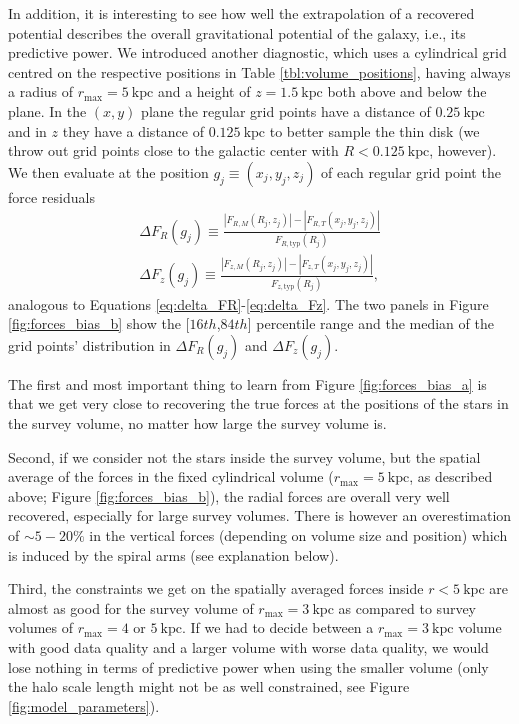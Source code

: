 \documentclass[iop,revtex4,numberedappendix,appendixfloats]{emulateapj}
\begin{document}
In addition, it is interesting to see how well the extrapolation of a recovered potential describes the overall gravitational potential of the galaxy, i.e., its predictive power. We introduced another diagnostic, which uses a cylindrical grid centred on the respective positions in Table \ref{tbl:volume_positions}, having always a radius of $r_\text{max}=5~\text{kpc}$ and a height of $z=1.5~\text{kpc}$ both above and below the plane.  In the $(x,y)$ plane the regular grid points have a distance of $0.25~\text{kpc}$ and in $z$ they have a distance of  $0.125~\text{kpc}$ to better sample the thin disk (we throw out grid points close to the galactic center with $R<0.125~\text{kpc}$, however). We then evaluate at the position $g_j \equiv (x_j,y_j,z_j)$ of each regular grid point the force residuals
\begin{eqnarray}
\Delta F_R(g_j) \equiv \frac{|F_{R,M}(R_j,z_j)| - |F_{R,T}(x_j,y_j,z_j)|}{F_{R,\text{typ}}(R_j)} \label{eq:delta_FR_grid}\\
\Delta F_z(g_j) \equiv \frac{|F_{z,M}(R_j,z_j)| - |F_{z,T}(x_j,y_j,z_j)|}{F_{z,\text{typ}}(R_j)},\label{eq:delta_Fz_grid}
\end{eqnarray}
analogous to Equations \eqref{eq:delta_FR}-\eqref{eq:delta_Fz}. The two panels in Figure \ref{fig:forces_bias_b} show the [$16th$,$84th$] percentile range and the median of the grid points' distribution in $\Delta F_R(g_j)$ and $\Delta F_z(g_j)$.

The first and most important thing to learn from Figure \ref{fig:forces_bias_a} is that we get very close to recovering the true forces at the positions of the stars in the survey volume, no matter how large the survey volume is.

Second, if we consider not the stars inside the survey volume, but the spatial average of the forces in the fixed cylindrical volume ($r_\text{max}=5~\text{kpc}$, as described above; Figure \ref{fig:forces_bias_b}), the radial forces are overall very well recovered, especially for large survey volumes. There is however an overestimation of $\sim5-20\%$ in the vertical forces (depending on volume size and position) which is induced by the spiral arms (see explanation below).

Third, the constraints we get on the spatially averaged forces inside $r<5~\text{kpc}$ are almost as good for the survey volume of $r_\text{max}=3~\text{kpc}$ as compared to survey volumes of $r_\text{max}=4$ or $5~\text{kpc}$. If we had to decide between a $r_\text{max}=3~\text{kpc}$ volume with good data quality and a larger volume with worse data quality, we would lose nothing in terms of predictive power when using the smaller volume (only the halo scale length might not be as well constrained, see Figure \ref{fig:model_parameters}).
\end{document}
